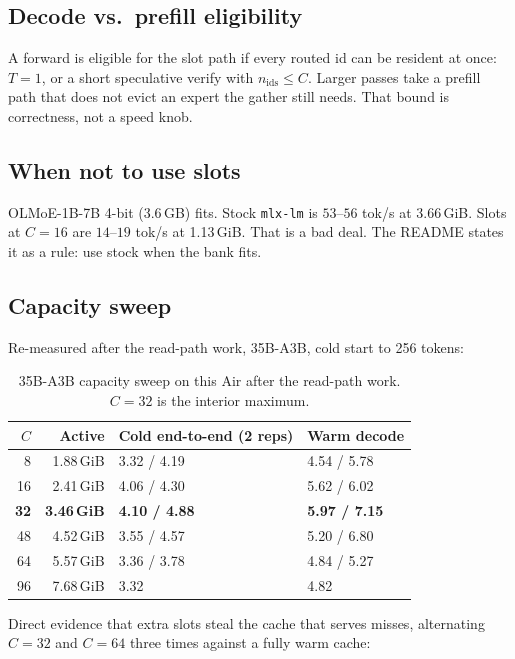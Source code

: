 \subsection{Decode vs.\ prefill eligibility}

A forward is eligible for the slot path if every routed id can be resident at once: $T{=}1$, or a short speculative verify with $n_{\mathrm{ids}} \le C$. Larger passes take a prefill path that does not evict an expert the gather still needs. That bound is correctness, not a speed knob.

\subsection{When not to use slots}

OLMoE-1B-7B 4-bit (3.6\,GB) fits. Stock \texttt{mlx-lm} is $53$--$56$ tok/s at 3.66\,GiB. Slots at $C{=}16$ are $14$--$19$ tok/s at 1.13\,GiB. That is a bad deal. The README states it as a rule: use stock when the bank fits.

\subsection{Capacity sweep}

Re-measured after the read-path work, 35B-A3B, cold start to 256 tokens:

\begin{table}[ht]
\centering
\caption{35B-A3B capacity sweep on this Air after the read-path work. $C{=}32$ is the interior maximum.}
\label{tab:csweep}
\begin{tabular}{@{}rrll@{}}
\toprule
$C$ & Active & Cold end-to-end (2 reps) & Warm decode \\
\midrule
8 & 1.88\,GiB & 3.32 / 4.19 & 4.54 / 5.78 \\
16 & 2.41\,GiB & 4.06 / 4.30 & 5.62 / 6.02 \\
\textbf{32} & \textbf{3.46\,GiB} & \textbf{4.10 / 4.88} & \textbf{5.97 / 7.15} \\
48 & 4.52\,GiB & 3.55 / 4.57 & 5.20 / 6.80 \\
64 & 5.57\,GiB & 3.36 / 3.78 & 4.84 / 5.27 \\
96 & 7.68\,GiB & 3.32 & 4.82 \\
\bottomrule
\end{tabular}
\end{table}

Direct evidence that extra slots steal the cache that serves misses, alternating $C{=}32$ and $C{=}64$ three times against a fully warm cache:

